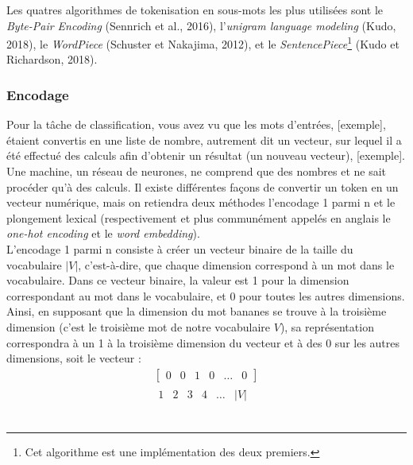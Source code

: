 \documentclass[12pt, french, twoside]{report}
\begin{document}
\indent Les quatres algorithmes de tokenisation en sous-mots les plus utilisées sont le \textit{Byte-Pair Encoding} (Sennrich et al., 2016), l'\textit{unigram language modeling} (Kudo, 2018), le \textit{WordPiece} (Schuster et Nakajima, 2012), et le \textit{SentencePiece}\footnote{Cet algorithme est une implémentation des deux premiers.} (Kudo et Richardson, 2018).\citep[chap.~2]{jurafsky}\\

\subsubsection{Encodage}
Pour la tâche de classification, vous avez vu que les mots d'entrées, [exemple], étaient convertis en une liste de nombre, autrement dit un vecteur, sur lequel il a été effectué des calculs afin d'obtenir un résultat (un nouveau vecteur), [exemple]. Une machine, un réseau de neurones, ne comprend que des nombres et ne sait procéder qu'à des calculs. Il existe différentes façons de convertir un token en un vecteur numérique, mais on retiendra deux méthodes l'encodage 1 parmi n et le plongement lexical (respectivement et plus communément appelés en anglais le \textit{one-hot encoding} et le \textit{word embedding}).\\

L'encodage 1 parmi n consiste à créer un vecteur binaire de la taille du vocabulaire $|V|$, c'est-à-dire, que chaque dimension correspond à un mot dans le vocabulaire. Dans ce vecteur binaire, la valeur est 1 pour la dimension correspondant au mot dans le vocabulaire, et 0 pour toutes les autres dimensions. Ainsi, en supposant que la dimension du mot \og bananes\fg{} se trouve à la troisième dimension (c'est le troisième mot de notre vocabulaire $V$), sa représentation correspondra à un 1 à la troisième dimension du vecteur et à des 0 sur les autres dimensions, soit le vecteur :
\begin{align*}
    \begin{bmatrix}
    0 & 0 & 1 & 0 & \dots & 0
    \end{bmatrix}\\
    \begin{matrix}
    1 & 2 & 3 & 4 & \dots & |V|
    \end{matrix}
\end{align*}
\hfill \citep[Chap 7]{jurafsky}\\
\end{document}
